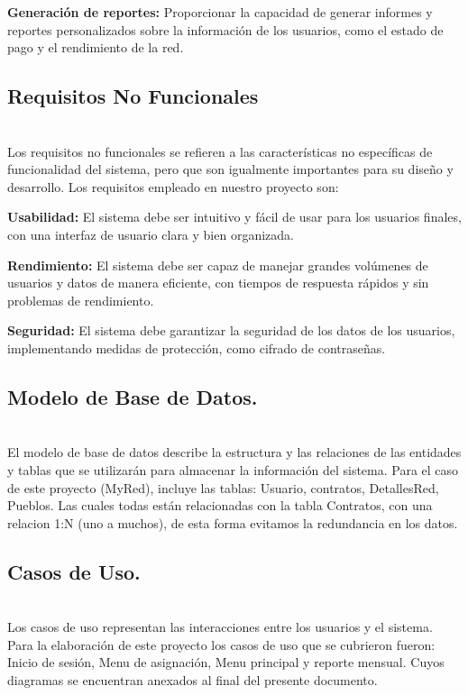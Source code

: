 \documentclass[a4paper,12pt]{article}
\begin{document}
\textbf{Generación de reportes:} Proporcionar la capacidad de generar informes y reportes personalizados sobre la información de los usuarios, como el estado de pago y el rendimiento de la red. 
\\

\subsection{\textbf{Requisitos No Funcionales}}\\
Los requisitos no funcionales se refieren a las características no específicas de funcionalidad del sistema, pero que son igualmente importantes para su diseño y desarrollo. Los requisitos empleado en nuestro proyecto son: 

\textbf{Usabilidad:} El sistema debe ser intuitivo y fácil de usar para los usuarios finales, con una interfaz de usuario clara y bien organizada.

\textbf{Rendimiento:} El sistema debe ser capaz de manejar grandes volúmenes de usuarios y datos de manera eficiente, con tiempos de respuesta rápidos y sin problemas de rendimiento.

\textbf{Seguridad:} El sistema debe garantizar la seguridad de los datos de los usuarios, implementando medidas de protección, como cifrado de contraseñas.
\\

\subsection{\textbf{Modelo de Base de Datos.}}\\
El modelo de base de datos describe la estructura y las relaciones de las entidades y tablas que se utilizarán para almacenar la información del sistema. Para el caso de este proyecto (MyRed), incluye las tablas: Usuario, contratos, DetallesRed, Pueblos. Las cuales todas están relacionadas con la tabla Contratos, con una relacion 1:N (uno a muchos), de esta forma evitamos la redundancia en los datos.

\subsection{\textbf{Casos de Uso.}}\\
Los casos de uso representan las interacciones entre los usuarios y el sistema. Para la elaboración de este proyecto los casos de uso que se cubrieron fueron: Inicio de sesión, Menu de asignación, Menu principal y reporte mensual. Cuyos diagramas se encuentran anexados al final del presente documento. 
\end{document}
